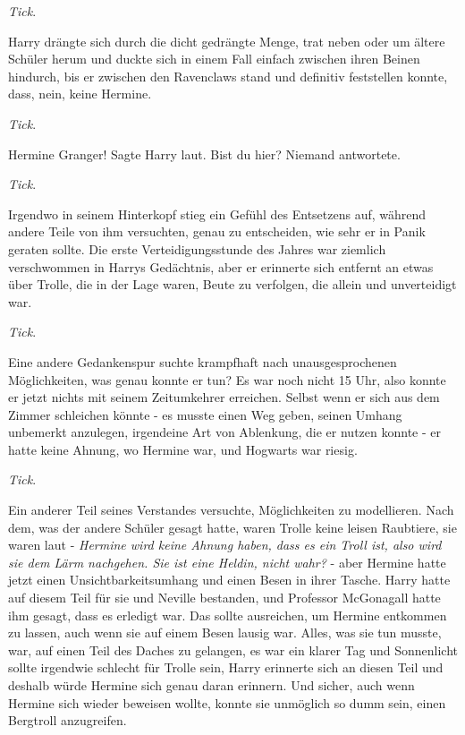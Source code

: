 \emph{Tick}.

Harry drängte sich durch die dicht gedrängte Menge, trat neben oder um ältere
Schüler herum und duckte sich in einem Fall einfach zwischen ihren Beinen
hindurch, bis er zwischen den Ravenclaws stand und definitiv feststellen konnte,
dass, nein, keine Hermine.

\emph{Tick}.

\glqq Hermine Granger!\grqq{} Sagte Harry laut. \glqq Bist du hier?\grqq{}
Niemand antwortete.

\emph{Tick}.

Irgendwo in seinem Hinterkopf stieg ein Gefühl des Entsetzens auf, während
andere Teile von ihm versuchten, genau zu entscheiden, wie sehr er in Panik
geraten sollte. Die erste Verteidigungsstunde des Jahres war ziemlich
verschwommen in Harrys Gedächtnis, aber er erinnerte sich entfernt an etwas über
Trolle, die in der Lage waren, Beute zu verfolgen, die allein und unverteidigt
war.

\emph{Tick}.

Eine andere Gedankenspur suchte krampfhaft nach unausgesprochenen Möglichkeiten,
was genau konnte er tun? Es war noch nicht 15 Uhr, also konnte er jetzt nichts
mit seinem Zeitumkehrer erreichen. Selbst wenn er sich aus dem Zimmer schleichen
könnte - es musste einen Weg geben, seinen Umhang unbemerkt anzulegen,
irgendeine Art von Ablenkung, die er nutzen konnte - er hatte keine Ahnung, wo
Hermine war, und Hogwarts war riesig.

\emph{Tick}.

Ein anderer Teil seines Verstandes versuchte, Möglichkeiten zu modellieren. Nach
dem, was der andere Schüler gesagt hatte, waren Trolle keine leisen Raubtiere,
sie waren laut - \emph{Hermine wird keine Ahnung haben, dass es ein Troll ist,
also wird sie dem Lärm nachgehen. Sie ist eine Heldin, nicht wahr? }- aber
Hermine hatte jetzt einen Unsichtbarkeitsumhang und einen Besen in ihrer Tasche.
Harry hatte auf diesem Teil für sie und Neville bestanden, und Professor
McGonagall hatte ihm gesagt, dass es erledigt war. Das sollte ausreichen, um
Hermine entkommen zu lassen, auch wenn sie auf einem Besen lausig war. Alles,
was sie tun musste, war, auf einen Teil des Daches zu gelangen, es war ein
klarer Tag und Sonnenlicht sollte irgendwie schlecht für Trolle sein, Harry
erinnerte sich an diesen Teil und deshalb würde Hermine sich genau daran
erinnern. Und sicher, auch wenn Hermine sich wieder beweisen wollte, konnte sie
unmöglich so dumm sein, einen Bergtroll anzugreifen.

